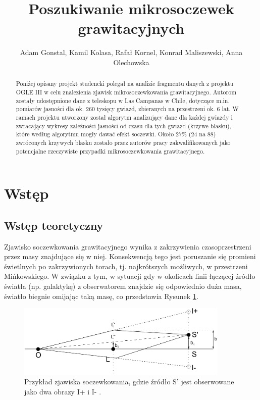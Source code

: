 \documentclass[a4paper,11pt]{article}
\author{Adam Gonstal, Kamil Kolasa, Rafał Kornel, Konrad Maliszewski, Anna Olechowska}
\title{Poszukiwanie mikrosoczewek grawitacyjnych}
\newcommand{\ak}{\hspace{0.7 cm}}
\begin{document}
\maketitle
\newpage
\begin{abstract}
\nocite{*}
\ak Poniżej opisany projekt studencki polegał na analizie fragmentu danych z projektu OGLE III w celu znalezienia zjawisk mikrosoczewkowania grawitacyjnego.  Autorom zostały udostępnione dane z teleskopu w Las Campanas w Chile, dotyczące m.in. pomiarów jasności dla ok. $260$ tysięcy  gwiazd, zbieranych na przestrzeni ok. $6$ lat. W ramach projektu utworzony został algorytm analizujący dane dla każdej gwiazdy i zwracający wykresy zależności jasności od czasu dla tych gwiazd (krzywe blasku), które według algorytmu mogły dawać efekt soczewki. Około $27$\% (24 na 88) zwróconych krzywych blasku zostało przez autorów pracy zakwalifikowanych jako potencjalne rzeczywiste przypadki mikrosoczewkowania grawitacyjnego.
\end{abstract}
\tableofcontents
\newpage
\section{Wstęp}
\subsection{Wstęp teoretyczny}
\ak Zjawisko soczewkowania grawitacyjnego wynika z zakrzywienia czasoprzestrzeni przez masy znajdujące się w niej. Konsekwencją tego jest poruszanie się promieni świetlnych po zakrzywionych torach, tj. najkrótszych możliwych, w przestrzeni Mińkowskiego. W związku z tym, w sytuacji gdy w okolicach linii łączącej źródło światła (np. galaktykę) z obserwatorem znajdzie się odpowiednio duża masa, światło biegnie omijając taką masę, co przedstawia Rysunek \ref{Fig1}. 

\begin{figure}[H]
\centering
\includegraphics[width=0.9\textwidth]{Lens.jpeg}
\caption{Przykład zjawiska soczewkowania, gdzie źródło S' jest obserwowane jako dwa obrazy I+ i I- \citet{Lens}.}
\label{Fig1}
\end{figure}
\end{document}

